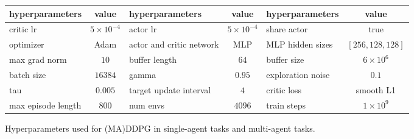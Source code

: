 \begin{tabular}{l c | l c | l c}
    \toprule
    hyperparameters & value & hyperparameters & value & hyperparameters & value \\
    \midrule
    critic lr & $5\times10^{-4}$ & actor lr & $5\times10^{-4}$ & share actor & true \\
    optimizer & Adam & actor and critic network & MLP & MLP hidden sizes & $[256,128,128]$ \\
    max grad norm & $10$ & buffer length & $64$ & buffer size & $6\times10^6$\\
    batch size & $16384$ & gamma & $0.95$ & exploration noise & $0.1$ \\
    tau & $0.005$ & target update interval & $4$ & critic loss & smooth L1 \\
    max episode length & $800$ & num envs & $4096$ & train steps & $1\times10^{9}$ \\
    \bottomrule
\end{tabular}
\caption{Hyperparameters used for (MA)DDPG in single-agent tasks and multi-agent tasks.}
